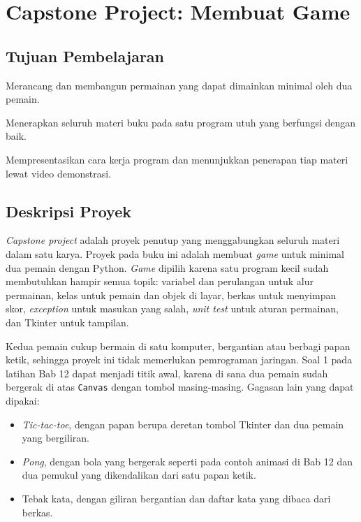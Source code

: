 \chapter{Capstone Project: Membuat Game}

\section*{Tujuan Pembelajaran}
\begin{daftarrapat}
  \item Merancang dan membangun permainan yang dapat dimainkan minimal oleh dua pemain.
  \item Menerapkan seluruh materi buku pada satu program utuh yang berfungsi dengan baik.
  \item Mempresentasikan cara kerja program dan menunjukkan penerapan tiap materi lewat video demonstrasi.
\end{daftarrapat}

\section{Deskripsi Proyek}

\textit{Capstone project} adalah proyek penutup yang menggabungkan seluruh materi dalam satu karya. Proyek pada buku ini adalah membuat \textit{game} untuk minimal dua pemain dengan Python. \textit{Game} dipilih karena satu program kecil sudah membutuhkan hampir semua topik: variabel dan perulangan untuk alur permainan, kelas untuk pemain dan objek di layar, berkas untuk menyimpan skor, \textit{exception} untuk masukan yang salah, \textit{unit test} untuk aturan permainan, dan Tkinter untuk tampilan.

Kedua pemain cukup bermain di satu komputer, bergantian atau berbagi papan ketik, sehingga proyek ini tidak memerlukan pemrograman jaringan. Soal 1 pada latihan Bab 12 dapat menjadi titik awal, karena di sana dua pemain sudah bergerak di atas \texttt{Canvas} dengan tombol masing-masing. Gagasan lain yang dapat dipakai:

\begin{itemize}
  \item \textit{Tic-tac-toe}, dengan papan berupa deretan tombol Tkinter dan dua pemain yang bergiliran.
  \item \textit{Pong}, dengan bola yang bergerak seperti pada contoh animasi di Bab 12 dan dua pemukul yang dikendalikan dari satu papan ketik.
  \item Tebak kata, dengan giliran bergantian dan daftar kata yang dibaca dari berkas.
\end{itemize}

